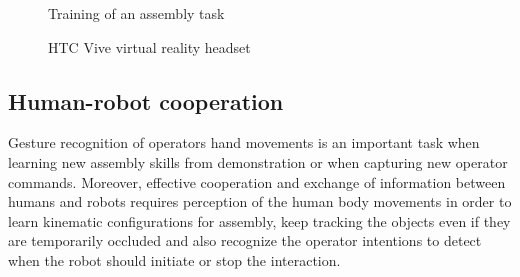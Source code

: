 \begin{figure}[H]
	\begin{floatrow}[2]
		{\caption[Training of a assembly task]{Training of an assembly task \cite{Webel2013}}\label{fig:ar-assembly}}
		{\caption[HTC Vive virtual reality headset]{HTC Vive virtual reality headset\protect\footnotemark}\label{fig:htc-vive}}
	\end{floatrow}
\end{figure}


%



\subsection{Human-robot cooperation}

Gesture recognition of operators hand movements \cite{Oikonomidis2012,Gleeson2013} is an important task when learning new assembly skills from demonstration \cite{Nikolaidis2013} or when capturing new operator commands. Moreover, effective cooperation \cite{Adorno2011} and exchange of information between humans and robots \cite{Pandey2012,Putz2014} requires perception of the human body movements \cite{Roitberg2014} in order to learn kinematic configurations for assembly, keep tracking the objects even if they are temporarily occluded and also recognize the operator intentions to detect when the robot should initiate or stop the interaction.


